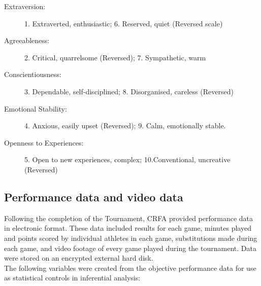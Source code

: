 \begin{description}
\item [Extraversion:] 1. Extraverted, enthusiastic; 6. Reserved, quiet (Reversed scale)
\item [Agreeableness:] 2. Critical, quarrelsome (Reversed); 7. Sympathetic, warm
\item [Conscientiousness:] 3. Dependable, self-disciplined; 8. Disorganised, careless (Reversed)
\item [Emotional Stability:] 4. Anxious, easily upset (Reversed); 9. Calm, emotionally stable.
\item [Openness to Experiences:] 5. Open to new experiences, complex; 10.Conventional, uncreative (Reversed)
\end{description}







\subsection{Performance data and video data}
Following the completion of the Tournament, CRFA provided performance data in electronic format. These data included results for each game, minutes played and points scored by individual athletes in each game, substitutions made during each game, and video footage of every game played during the tournament. Data were stored on an encrypted external hard disk. \\

The following variables were created from the objective performance data for use as statistical controls in inferential analysis:


